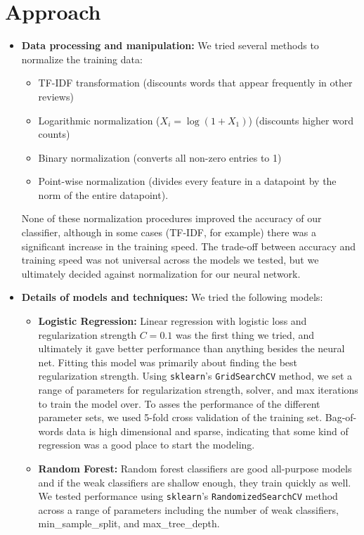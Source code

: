 \section{Approach}
\medskip
\begin{itemize}
  
\item \textbf{Data processing and manipulation:} We tried several methods to normalize the training data:
  \begin{itemize}
  \item TF-IDF transformation (discounts words that appear frequently in other reviews)
  \item Logarithmic normalization ($X_i=\log(1+X_1)$) (discounts higher word counts)
  \item Binary normalization (converts all non-zero entries to 1)
  \item Point-wise normalization (divides every feature in a datapoint by the norm of the entire datapoint).
  \end{itemize}
  None of these normalization procedures improved the accuracy of our classifier, although in some cases (TF-IDF, for example) there was a significant increase in the training speed. The trade-off between accuracy and training speed was not universal across the models we tested, but we ultimately decided against normalization for our neural network.
\item \textbf{Details of models and techniques:} We tried the following models:
  \begin{itemize}
  \item \textbf{Logistic Regression:} Linear regression with logistic loss and regularization strength $C=0.1$ was the first thing we tried, and ultimately it gave better performance than anything besides the neural net. Fitting this model was primarily about finding the best regularization strength. Using \texttt{sklearn}'s \texttt{GridSearchCV} method, we set a range of parameters for regularization strength, solver, and max iterations to train the model over. To asses the performance of the different parameter sets, we used 5-fold cross validation of the training set. Bag-of-words data is high dimensional and sparse, indicating that some kind of regression was a good place to start the modeling. 
  \item \textbf{Random Forest:} Random forest classifiers are good all-purpose models and if the weak classifiers are shallow enough, they train quickly as well. We tested performance using \texttt{sklearn}'s \texttt{RandomizedSearchCV} method across a range of parameters including the number of weak classifiers, min\_sample\_split, and max\_tree\_depth. 

\end{itemize}
\end{itemize}
